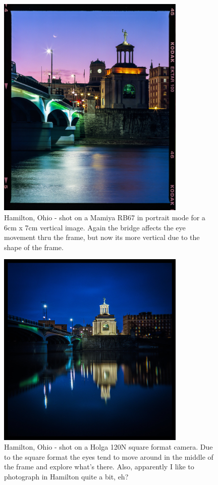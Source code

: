 \documentclass[a4paper]{article}
\begin{document}
\begin{figure}[ht!]
    \centering
    \includegraphics[width=90mm]{img/39114574851_e9da9d4720_k.jpeg}
    \caption{Hamilton, Ohio - shot on a Mamiya RB67 in portrait mode for a 6cm x 7cm vertical image. Again the bridge affects the eye movement thru the frame, but now its more vertical due to the shape of the frame.}
\end{figure}

\begin{figure}[ht!]
    \centering
    \includegraphics[width=90mm]{img/image-asset.jpeg}
    \caption{Hamilton, Ohio - shot on a Holga 120N square format camera. Due to the square format the eyes tend to move around in the middle of the frame and explore what’s there. Also, apparently I like to photograph in Hamilton quite a bit, eh?}
\end{figure}
\end{document}
